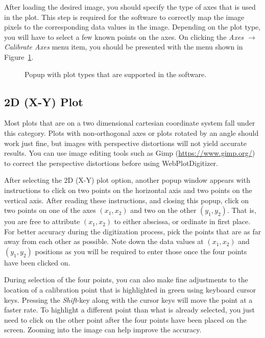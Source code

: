 \documentclass[letterpaper, 11pt]{article}
\begin{document}
After loading the desired image, you should specify the type of axes that is used in the plot. This step is required for the software to correctly map the image pixels to the corresponding data values in the image. Depending on the plot type, you will have to select a few known points on the axes. On clicking the \emph{Axes $\rightarrow$ Calibrate Axes} menu item, you should be presented with the menu shown in Figure~\ref{fig:defineAxesPopup}.
\begin{figure}
\begin{center}
\caption{Popup with plot types that are supported in the software.}
\label{fig:defineAxesPopup}
\end{center}
\end{figure}

\subsection{2D (X-Y) Plot}
Most plots that are on a two dimensional cartesian coordinate system fall under this category. Plots with non-orthogonal axes or plots rotated by an angle should work just fine, but images with perspective distortions will not yield accurate results. You can use image editing tools such as Gimp (\url{https://www.gimp.org/}) to correct the perspective distortions before using WebPlotDigitizer.

After selecting the 2D (X-Y) plot option, another popup window appears with instructions to click on two points on the horizontal axis and two points on the vertical axis. After reading these instructions, and closing this popup, click on two points on one of the axes $(x_1, x_2)$ and two on the other $(y_1, y_2)$. That is, you are free to attribute $(x_1, x_2)$ to either abscissa, or ordinate in first place. For better accuracy during the digitization process, pick the points that are as far away from each other as possible. Note down the data values at $(x_1, x_2)$ and $(y_1, y_2)$ positions as you will be required to enter those once the four points have been clicked on.

During selection of the four points, you can also make fine adjustments to the location of a calibration point that is highlighted in green using keyboard cursor keys. Pressing the \emph{Shift}-key along with the cursor keys will move the point at a faster rate. To highlight a different point than what is already selected, you just need to click on the other point after the four points have been placed on the screen. Zooming into the image can help improve the accuracy.
\end{document}
